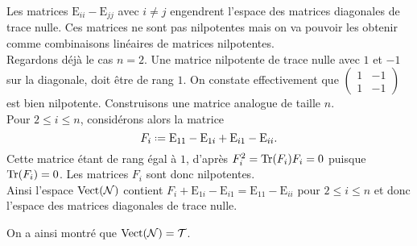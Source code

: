 \begin{solution}
\begin{itemize}
{        }
        Les matrices $\mathrm{E}_{ii} - \mathrm{E}_{jj}$ avec $i \not= j$ engendrent l'espace des matrices diagonales de trace nulle. Ces matrices ne sont pas nilpotentes mais on va pouvoir les obtenir comme combinaisons linéaires de matrices nilpotentes. \\
        Regardons déjà le cas $n = 2$. Une matrice nilpotente de trace nulle avec $1$ et $-1$ sur la diagonale, doit être de rang $1$. On constate effectivement que $\begin{pmatrix} 1 & -1 \\ 1 & -1 \end{pmatrix}$ est bien nilpotente. Construisons une matrice analogue de taille $n$. \\
        Pour $2 \leqslant i \leqslant n$, considérons alors la matrice
        $$F_i \defeq \mathrm{E}_{11} - \mathrm{E}_{1i} + \mathrm{E}_{i1} - \mathrm{E}_{ii}.$$
        Cette matrice étant de rang égal à $1$, d'après  $F_i^2 = \mathrm{Tr} (F_i) F_i = 0$ puisque $\mathrm{Tr}(F_i) = 0$. Les matrices $F_i$ sont donc nilpotentes. \\
        Ainsi l'espace $\mathrm{Vect}(\mathcal{N})$ contient $F_i + \mathrm{E}_{1i} - \mathrm{E}_{i1} = \mathrm{E}_{11}-\mathrm{E}_{ii}$ pour $2 \leqslant i \leqslant n$ et donc l'espace des matrices diagonales de trace nulle. 
    \end{itemize}
    On a ainsi montré que $\mathrm{Vect}(\mathcal{N}) = \mathcal{T}$.
\end{solution}

